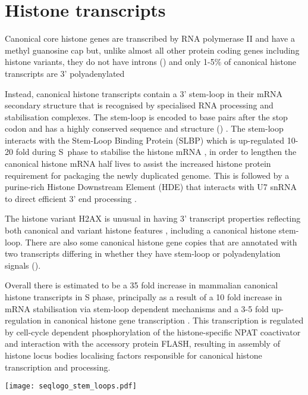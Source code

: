 \section{Histone transcripts}
  
	Canonical core histone genes are transcribed by RNA polymerase II 
	and have a methyl guanosine cap 
	but, unlike almost all other protein coding genes including histone variants, 
	they do not have introns () 
	and only 1-5\% of canonical histone transcripts are 3' polyadenylated 

	Instead, canonical histone transcripts contain a 3' stem-loop in their mRNA secondary structure 
	that is recognised by specialised RNA processing and stabilisation complexes.
	The stem-loop is encoded \StemLoopStart{} to \StemLoopEnd{} base pairs after the stop codon 
	and has a highly conserved sequence and structure () \citep{stem-loop-structure}.
	The stem-loop interacts with the Stem-Loop Binding Protein (SLBP) 
	which is up-regulated 10-20 fold during S~phase to stabilise the histone mRNA \citep{SLBP-regulation}, 
	in order to lengthen the canonical histone mRNA half lives 
	to assist the increased histone protein requirement for packaging the newly duplicated genome.
	This is followed by a purine-rich Histone Downstream Element (HDE) 
	that interacts with U7 snRNA to direct efficient 3' end processing \citep{HDE-sequence}.

	The histone variant H2AX is unusual in having 3' transcript properties reflecting
	both canonical and variant histone features \citep{HTwoAX-transcripts}, including a canonical histone stem-loop. 
	There are also some canonical histone gene copies that are annotated with two transcripts 
	differing in whether they have stem-loop or polyadenylation signals (). 

	Overall there is estimated to be a 35 fold increase in mammalian canonical histone transcripts in S phase,
	principally as a result of a 10 fold increase in mRNA stabilisation via stem-loop dependent mechanisms 
	and a 3-5 fold up-regulation in canonical histone gene transcription . 
	This transcription is regulated by cell-cycle dependent phosphorylation of the histone-specific NPAT coactivator 
	and interaction with the accessory protein FLASH, 
	resulting in assembly of histone locus bodies localising factors responsible for canonical histone transcription and processing.

    \begin{figure*}
      \centering
      \texttt{[image: seqlogo\_stem\_loops.pdf]}
      \label{fig:stem-loop-seqlogo}
    \end{figure*}
